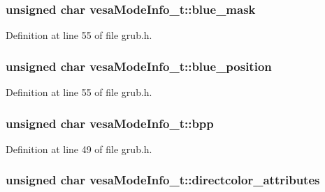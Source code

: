 \hypertarget{structvesaModeInfo__t_aff78588c9039e0f8985d08bc2c5dd5ae}{
\subsubsection[{blue\+\_\+mask}]{\setlength{\rightskip}{0pt plus 5cm}unsigned char vesa\+Mode\+Info\+\_\+t\+::blue\+\_\+mask}}\label{structvesaModeInfo__t_aff78588c9039e0f8985d08bc2c5dd5ae}


Definition at line 55 of file grub.\+h.

\hypertarget{structvesaModeInfo__t_a20289f01bea4e5cbb2533e3c97f8d308}{
\subsubsection[{blue\+\_\+position}]{\setlength{\rightskip}{0pt plus 5cm}unsigned char vesa\+Mode\+Info\+\_\+t\+::blue\+\_\+position}}\label{structvesaModeInfo__t_a20289f01bea4e5cbb2533e3c97f8d308}


Definition at line 55 of file grub.\+h.

\hypertarget{structvesaModeInfo__t_acbf51c6b217de951bd6b40ae60b2343d}{
\subsubsection[{bpp}]{\setlength{\rightskip}{0pt plus 5cm}unsigned char vesa\+Mode\+Info\+\_\+t\+::bpp}}\label{structvesaModeInfo__t_acbf51c6b217de951bd6b40ae60b2343d}


Definition at line 49 of file grub.\+h.

\hypertarget{structvesaModeInfo__t_afb95209f1e3ffa74635cb68495ecec26}{
\subsubsection[{directcolor\+\_\+attributes}]{\setlength{\rightskip}{0pt plus 5cm}unsigned char vesa\+Mode\+Info\+\_\+t\+::directcolor\+\_\+attributes}}\label{structvesaModeInfo__t_afb95209f1e3ffa74635cb68495ecec26}


